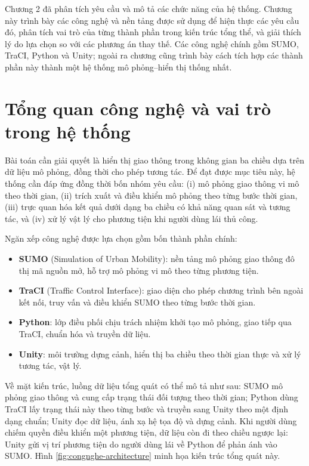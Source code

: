 ﻿\documentclass[../DoAn.tex]{subfiles}
\begin{document}
Chương 2 đã phân tích yêu cầu và mô tả các chức năng của hệ thống. Chương này
trình bày các công nghệ và nền tảng được sử dụng để hiện thực các yêu cầu đó,
phân tích vai trò của từng thành phần trong kiến trúc tổng thể, và giải thích lý
do lựa chọn so với các phương án thay thế. Các công nghệ chính gồm \gls{SUMO},
\gls{TraCI}, Python và Unity; ngoài ra chương cũng trình bày cách tích hợp các
thành phần này thành một hệ thống mô phỏng--hiển thị thống nhất.

\section{Tổng quan công nghệ và vai trò trong hệ thống}

Bài toán cần giải quyết là hiển thị giao thông trong không gian ba chiều dựa trên
dữ liệu mô phỏng, đồng thời cho phép tương tác. Để đạt được mục tiêu này, hệ
thống cần đáp ứng đồng thời bốn nhóm yêu cầu: (i) mô phỏng giao thông vi mô theo
thời gian, (ii) trích xuất và điều khiển mô phỏng theo từng bước thời gian, (iii)
trực quan hóa kết quả dưới dạng ba chiều có khả năng quan sát và tương tác, và
(iv) xử lý vật lý cho phương tiện khi người dùng lái thủ công.

Ngăn xếp công nghệ được lựa chọn gồm bốn thành phần chính:

\begin{itemize}[leftmargin=2em]
	\item \textbf{\gls{SUMO}} (Simulation of Urban Mobility): nền tảng mô phỏng
	giao thông đô thị mã nguồn mở, hỗ trợ mô phỏng vi mô theo từng phương tiện.
	\item \textbf{\gls{TraCI}} (Traffic Control Interface): giao diện cho phép
	chương trình bên ngoài kết nối, truy vấn và điều khiển \gls{SUMO} theo từng
	bước thời gian.
	\item \textbf{Python}: lớp điều phối chịu trách nhiệm khởi tạo mô phỏng, giao
	tiếp qua \gls{TraCI}, chuẩn hóa và truyền dữ liệu.
	\item \textbf{Unity}: môi trường dựng cảnh, hiển thị ba chiều theo thời gian
	thực và xử lý tương tác, vật lý.
\end{itemize}

Về mặt kiến trúc, luồng dữ liệu tổng quát có thể mô tả như sau: \gls{SUMO} mô
phỏng giao thông và cung cấp trạng thái đối tượng theo thời gian; Python dùng
\gls{TraCI} lấy trạng thái này theo từng bước và truyền sang Unity theo một định
dạng chuẩn; Unity đọc dữ liệu, ánh xạ hệ tọa độ và dựng cảnh. Khi người dùng
chiếm quyền điều khiển một phương tiện, dữ liệu còn đi theo chiều ngược lại: Unity
gửi vị trí phương tiện do người dùng lái về Python để phản ánh vào \gls{SUMO}.
Hình \ref{fig:congnghe-architecture} minh họa kiến trúc tổng quát này.
\end{document}
